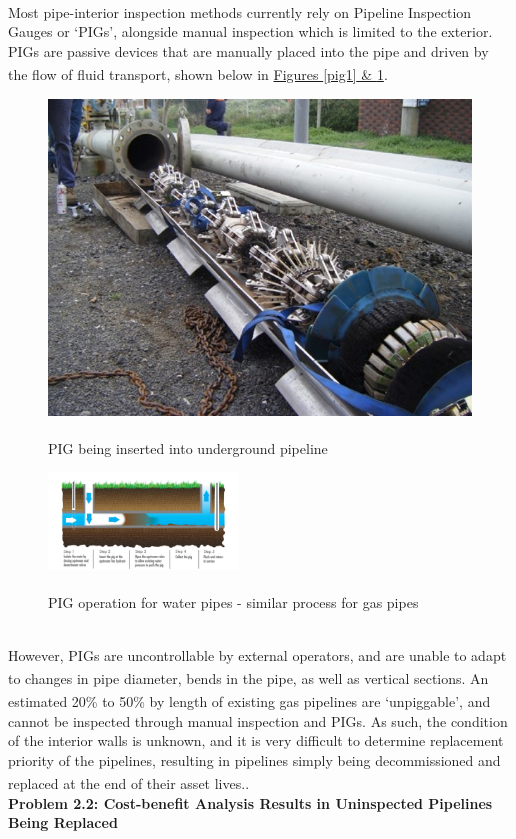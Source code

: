 \documentclass[11pt]{article}		%
\newcommand{\supercite}[1]{\textsuperscript{\cite{#1}}}		%
\begin{document}
	\\
	Most pipe-interior inspection methods currently rely on Pipeline Inspection Gauges or ‘PIGs’, alongside manual inspection which is limited to the exterior. PIGs are passive devices that are manually placed into the pipe and driven by the flow of fluid transport\supercite{pigging}, shown below in \hyperref[pig1]{Figures \ref*{pig1} \& \ref*{pig2}}.
		\begin{figure}[h]
					\centering
					\begin{multicols}{2}
						\includegraphics[height=0.22\textwidth]{pig1.jpg}
						\caption{PIG being inserted into underground pipeline\supercite{pigimage1}}
						\label{pig1}
						\columnbreak
						\includegraphics[width=0.45\textwidth]{pig2.jpg}
						\caption{PIG operation for water pipes - similar process for gas pipes \supercite{pigimage2}}
						\label{pig2}
					\end{multicols}
				\end{figure}
			\vspace{-0.75cm}
    \\
    \hspace*{3ex}However, PIGs are uncontrollable by external operators, and are unable to adapt to changes in pipe diameter, bends in the pipe, as well as vertical sections\supercite{piglimitations}. An estimated 20\% to 50\% by length of existing gas pipelines are ‘unpiggable’\supercite{unpiggable}, and cannot be inspected through manual inspection and PIGs. As such, the condition of the interior walls is unknown, and it is very difficult to determine replacement priority of the pipelines, resulting in pipelines simply being decommissioned and replaced at the end of their asset lives.\supercite{decommission}.
    \\
    \textbf{Problem 2.2: Cost-benefit Analysis Results in Uninspected Pipelines Being Replaced}
    \\
\end{document}
